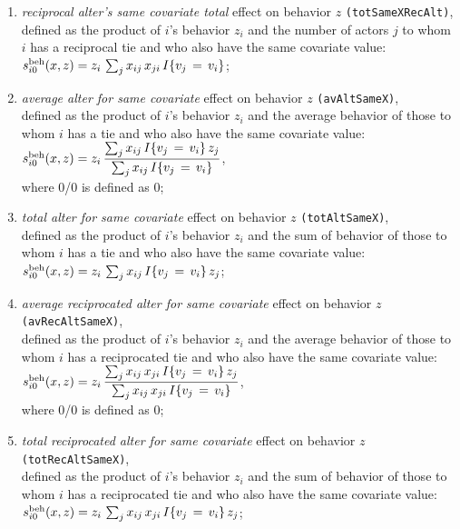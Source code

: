 \documentclass[a4paper,fleqn,11pt]{article}
\newcommand{\+}{\, + \,}
\newcommand{\vit}{\theenumi}
\begin{document}
\begin{enumerate}
\item \emph{reciprocal alter's same covariate total } effect on behavior $z$
 \texttt{(totSameXRecAlt)},\\
      defined as the product of $i$'s behavior $z_i$ and
      the number of actors $j$ to whom $i$ has a reciprocal tie
      and who also have the same covariate value:\\
       $s^{\rm beh}_{i\vit}(x, z) = z_i \,
            \sum_j x_{ij}\,x_{ji} \, I\{v_j\,=\,v_i\} $; \\


\item \emph{average alter for same covariate } effect on behavior $z$
 \texttt{(avAltSameX)},\\
      defined as the product of $i$'s behavior $z_i$ and
      the average behavior of those to whom $i$ has a tie
      and who also have the same covariate value:\\[0.6em]
       $s^{\rm beh}_{i\vit}(x, z) = z_i \,  \displaystyle
            \frac{\sum_j x_{ij} \, I\{v_j\,=\,v_i\}\, z_j }{\sum_j x_{ij}\, I\{v_j\,=\,v_i\} }$,\\
      where 0/0 is defined as 0;

\item \emph{total alter for same covariate  } effect on behavior $z$
 \texttt{(totAltSameX)},\\
      defined as the product of $i$'s behavior $z_i$ and
      the sum of behavior of those to whom $i$ has a tie
      and who also have the same covariate value:\\
       $s^{\rm beh}_{i\vit}(x, z) = z_i \,
            \sum_j x_{ij}\, I\{v_j\,=\,v_i\} \, z_j $; \\

\item \emph{average reciprocated alter for same covariate } effect on behavior $z$
 \texttt{(avRecAltSameX)},\\[0.3em]
      defined as the product of $i$'s behavior $z_i$ and
      the average behavior of those to whom $i$ has a  reciprocated tie
      and who also have the same covariate value:\\
       $s^{\rm beh}_{i\vit}(x, z) = z_i \,  \displaystyle
            \frac{\sum_j x_{ij} \,x_{ji}\, I\{v_j\,=\,v_i\}\, z_j }{\sum_j x_{ij}\,x_{ji}\, I\{v_j\,=\,v_i\} }$,\\
      where 0/0 is defined as 0;

\item \emph{total  reciprocated alter for same covariate  } effect on behavior $z$
 \texttt{(totRecAltSameX)},\\
      defined as the product of $i$'s behavior $z_i$ and
      the sum of behavior of those to whom $i$ has a  reciprocated tie
      and who also have the same covariate value:\\
       $s^{\rm beh}_{i\vit}(x, z) = z_i \,
            \sum_j x_{ij}\,x_{ji} \, I\{v_j\,=\,v_i\} \, z_j $; \\


\end{enumerate}
\end{document}
